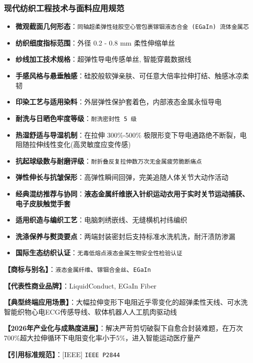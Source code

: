 \documentclass[11pt,openright,twoside,UTF8]{ctexbook}
\begin{document}
\subsubsection*{现代纺织工程技术与面料应用规范}
\begin{itemize} \setlength{\itemsep}{2pt}
    \item \textbf{微观截面几何形态}：\texttt{同轴超柔弹性硅胶空心管包裹镓铟液态合金 (EGaIn) 流体金属芯}
    \item \textbf{纺织细度指标范围}：外径 0.2 - 0.8 mm 柔性伸缩单丝
    \item \textbf{纱线加工技术规格}：超弹性导电传感单丝, 智能穿戴数据线
    \item \textbf{手感风格与悬垂触感}：硅胶般软弹亲肤、可任意大倍率拉伸打结、触感冰凉柔韧
    \item \textbf{印染工艺与适用染料}：外层弹性保护套着色，内部液态金属永恒导电
    \item \textbf{耐洗与日晒色牢度等级}：\texttt{耐洗密封性 5 级}
    \item \textbf{热湿舒适与导湿机制}：在拉伸 300\%-500\% 极限形变下导电通路绝不断裂，电阻随拉伸线性变化(高灵敏度应变传感)
    \item \textbf{抗起球级数与耐磨评级}：\texttt{耐折叠反复拉伸数万次无金属疲劳脆断痛点}
    \item \textbf{弹性伸长与抗皱保形}：高弹性瞬间回弹，完美追随人体关节大动作活动
    \item \textbf{经典混纺推荐与协同}：\textbf{液态金属纤维嵌入针织运动衣用于实时关节运动捕获、电子皮肤触觉手套}
    \item \textbf{适用织造与编织工艺}：电脑刺绣嵌线、无缝横机衬纬编织
    \item \textbf{洗涤保养与熨烫要点}：两端封装密封后支持标准水洗机洗，耐汗渍防渗漏
    \item \textbf{国际生态纺织认证}：\texttt{无毒低熔点液态金属生物安全性检验认证}
\end{itemize}
\vspace{0.2cm}

\noindent\textbf{【商标与别名】}：\texttt{液态金属纤维}、\texttt{镓铟合金丝}、\texttt{EGaIn}\par
\noindent\textbf{【代表性商业品牌】}：LiquidConduct, EGaIn Fiber\par
\noindent\textbf{【典型终端应用场景】}：大幅拉伸变形下电阻近乎零变化的超弹柔性天线、可水洗智能织物心电ECG传感导线、软体机器人人工肌肉驱动线\par
\noindent\textbf{【2026年产业化与成熟度进展】}：解决严苛剪切破裂下自愈合封装难题，在万次700\%超大拉伸循环下电阻变化率小于5\%，进入智能运动医疗量产\par
\noindent\textbf{【引用标准规范】}：[IEEE] \texttt{IEEE P2844}\par
\vspace{0.5cm}
\end{document}
